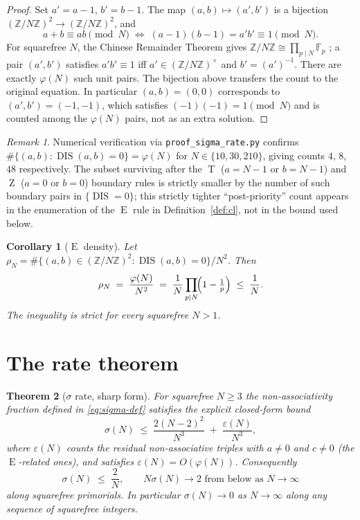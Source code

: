 \documentclass[11pt,reqno]{amsart}
\theoremstyle{plain}
\newtheorem{theorem}{Theorem}
\newtheorem{corollary}[theorem]{Corollary}
\theoremstyle{definition}
\theoremstyle{remark}
\newtheorem*{remark}{Remark}
\DeclareMathOperator{\DIS}{DIS}
\DeclareMathOperator{\ECHO}{E}
\DeclareMathOperator{\HARM}{T}
\DeclareMathOperator{\VOID}{Z}
\newcommand{\ZN}{\mathbb{Z}/N\mathbb{Z}}
\begin{document}
\begin{proof}
Set $a'=a-1$, $b'=b-1$. The map $(a,b)\mapsto(a',b')$ is a bijection
$(\ZN)^{2}\to(\ZN)^{2}$, and
\[
  a+b\equiv ab\pmod N
  \;\Longleftrightarrow\;
  (a-1)(b-1)=a'b'\equiv 1\pmod N.
\]
For squarefree $N$, the Chinese Remainder Theorem gives
$\ZN\cong\prod_{p\mid N}\mathbb F_{p}$ \cite{Gauss1801,Lang2002};
a pair $(a',b')$ satisfies $a'b'\equiv 1$ iff $a'\in(\ZN)^{\times}$
and $b'=(a')^{-1}$. There are exactly $\varphi(N)$ such unit pairs.
The bijection above transfers the count to the original equation.
In particular $(a,b)=(0,0)$ corresponds to $(a',b')=(-1,-1)$, which
satisfies $(-1)(-1)=1\pmod N$ and is counted among the $\varphi(N)$
pairs, not as an extra solution.
\end{proof}

\begin{remark}
Numerical verification via \texttt{proof\_sigma\_rate.py} confirms
$\#\{(a,b):\DIS(a,b)=0\}=\varphi(N)$ for
$N\in\{10,30,210\}$, giving counts $4$, $8$, $48$ respectively.
The subset surviving after the $\HARM$ ($a=N-1$ or $b=N-1$) and
$\VOID$ ($a=0$ or $b=0$) boundary rules is strictly smaller by the
number of such boundary pairs in $\{\DIS=0\}$; this strictly tighter
``post-priority'' count appears in the enumeration of the $\ECHO$
rule in Definition~\ref{def:cl}, not in the bound used below.
\end{remark}

\begin{corollary}[$\ECHO$ density]\label{cor:echo-density}
Let $\rho_N=\#\{(a,b)\in(\ZN)^{2}:\DIS(a,b)=0\}/N^{2}$. Then
\begin{equation}\label{eq:rho}
  \rho_N\;=\;\frac{\varphi(N)}{N^{2}}
  \;=\;\frac{1}{N}\prod_{p\mid N}\!\Bigl(1-\tfrac{1}{p}\Bigr)
  \;\le\;\frac{1}{N}.
\end{equation}
The inequality is strict for every squarefree $N>1$.
\end{corollary}

\section{The rate theorem}\label{sec:rate}

\begin{theorem}[$\sigma$ rate, sharp form]\label{thm:rate}
For squarefree $N\ge 3$ the non-associativity fraction defined in
\eqref{eq:sigma-def} satisfies the explicit closed-form bound
\begin{equation}\label{eq:rate}
  \sigma(N)\;\le\;\frac{2(N-2)^{2}}{N^{3}}\;+\;\frac{\varepsilon(N)}{N^{3}},
\end{equation}
where $\varepsilon(N)$ counts the residual non-associative triples
with $a\neq 0$ \emph{and} $c\neq 0$ (the $\ECHO$-related ones), and
satisfies $\varepsilon(N)=O(\varphi(N))$. Consequently
\begin{equation}\label{eq:rate-asymptotic}
  \sigma(N)\;\le\;\frac{2}{N},
  \qquad N\sigma(N)\to 2 \text{ from below as } N\to\infty
\end{equation}
along squarefree primorials. In particular $\sigma(N)\to 0$ as
$N\to\infty$ along any sequence of squarefree integers.
\end{theorem}
\end{document}
